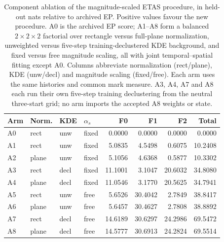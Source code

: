 \begin{table}[htbp]\centering\scriptsize
\setlength{\tabcolsep}{3pt}
\begin{tabular}{@{}llllrrrr@{}}\toprule
Arm & Norm. & KDE & $\alpha_s$ & F0 & F1 & F2 & Total\\\midrule
A0 & rect & unw & fixed & 0.0000 & 0.0000 & 0.0000 & 0.0000 \\
A1 & rect & unw & fixed & 5.0835 & 4.5498 & 0.6075 & 10.2408 \\
A2 & plane & unw & fixed & 5.1056 & 4.6368 & 0.5877 & 10.3302 \\
A3 & rect & decl & fixed & 11.1001 & 3.1047 & 20.6032 & 34.8080 \\
A4 & plane & decl & fixed & 11.0546 & 3.1770 & 20.5625 & 34.7941 \\
A5 & rect & unw & free & 5.6526 & 30.4042 & 2.7849 & 38.8417 \\
A6 & plane & unw & free & 5.6457 & 30.4627 & 2.7808 & 38.8892 \\
A7 & rect & decl & free & 14.6189 & 30.6297 & 24.2986 & 69.5472 \\
A8 & plane & decl & free & 14.5777 & 30.6913 & 24.2824 & 69.5514 \\
\bottomrule\end{tabular}
\caption{Component ablation of the magnitude-scaled ETAS procedure, in held-out nats relative to archived EP. Positive values favour the new procedure. A0 is the archived EP score; A1--A8 form a balanced $2\times2\times2$ factorial over rectangle versus full-plane normalization, unweighted versus five-step training-declustered KDE background, and fixed versus free magnitude scaling, all with joint temporal--spatial fitting except A0. Columns abbreviate normalization (rect/plane), KDE (unw/decl) and magnitude scaling (fixed/free). Each arm uses the same histories and common mark measure. A3, A4, A7 and A8 each run their own five-step training declustering from the neutral three-start grid; no arm imports the accepted A8 weights or state.}
\label{tab:epplus-ablation}
\end{table}

